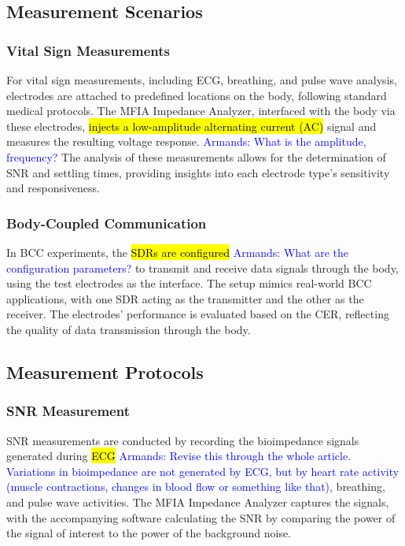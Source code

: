 \documentclass[conference]{IEEEtran}
\newcommand{\notea}[1]{\textcolor{blue}{Armands: #1}}
\begin{document}
\subsection{Measurement Scenarios}

\subsubsection{Vital Sign Measurements}
For vital sign measurements, including ECG, breathing, and pulse wave analysis, electrodes are attached to predefined locations on the body, following standard medical protocols. The MFIA Impedance Analyzer, interfaced with the body via these electrodes, \hl{injects a low-amplitude alternating current (AC)} signal and measures the resulting voltage response. \notea{What is the amplitude, frequency?} The analysis of these measurements allows for the determination of SNR and settling times, providing insights into each electrode type's sensitivity and responsiveness.

\subsubsection{Body-Coupled Communication}
In BCC experiments, the \hl{SDRs are configured} \notea{What are the configuration parameters?} to transmit and receive data signals through the body, using the test electrodes as the interface. The setup mimics real-world BCC applications, with one SDR acting as the transmitter and the other as the receiver. The electrodes' performance is evaluated based on the CER, reflecting the quality of data transmission through the body.

\subsection{Measurement Protocols}

\subsubsection{SNR Measurement}
SNR measurements are conducted by recording the bioimpedance signals generated during \hl{ECG} \notea{Revise this through the whole article. Variations in bioimpedance are not generated by ECG, but by heart rate activity (muscle contractions, changes in blood flow or something like that)}, breathing, and pulse wave activities. The MFIA Impedance Analyzer captures the signals, with the accompanying software calculating the SNR by comparing the power of the signal of interest to the power of the background noise.
\end{document}
